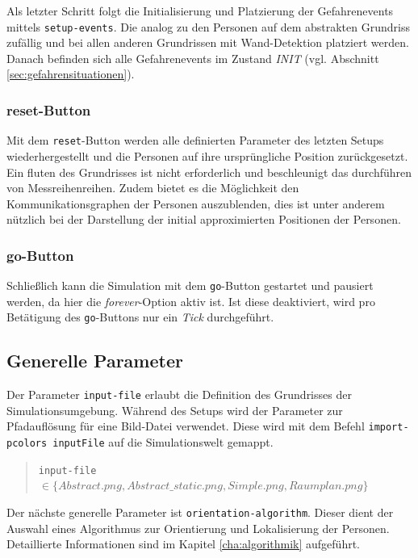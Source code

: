 Als letzter Schritt folgt die Initialisierung und Platzierung der Gefahrenevents  mittels \verb|setup-events|. Die analog zu den Personen auf dem abstrakten Grundriss zufällig und bei allen anderen Grundrissen mit Wand-Detektion platziert werden. Danach befinden sich alle Gefahrenevents im Zustand \emph{INIT} (vgl. Abschnitt \ref{sec:gefahrensituationen}).
 
\subsubsection*{reset-Button}

Mit dem \verb|reset|-Button werden alle definierten Parameter des letzten Setups wiederhergestellt und die Personen auf ihre ursprüngliche Position zurückgesetzt.
Ein fluten des Grundrisses ist nicht erforderlich und beschleunigt das durchführen von Messreihenreihen.
Zudem bietet es die Möglichkeit den Kommunikationsgraphen der Personen auszublenden, dies ist unter anderem nützlich bei der Darstellung der initial approximierten Positionen der Personen.

\subsubsection*{go-Button}

Schließlich kann die Simulation mit dem \verb|go|-Button gestartet und pausiert werden, da hier die \emph{forever}-Option aktiv ist. Ist diese deaktiviert, wird pro Betätigung des \verb|go|-Buttons nur ein \emph{Tick} durchgeführt.

\subsection{Generelle Parameter}
\label{sec:gui_general}

Der Parameter \verb|input-file| erlaubt die Definition des Grundrisses der Simulationsumgebung. Während des Setups wird der Parameter zur Pfadauflösung für eine Bild-Datei verwendet. Diese wird mit dem Befehl \verb|import-pcolors inputFile| auf die Simulationswelt gemappt.

\begin{quote}
\verb|input-file| $\in \{Abstract.png, Abstract\_static.png, Simple.png, Raumplan.png\}$
\end{quote}

Der nächste generelle Parameter ist \verb|orientation-algorithm|. Dieser dient der Auswahl eines Algorithmus zur Orientierung und Lokalisierung der Personen. Detaillierte Informationen sind im Kapitel \ref{cha:algorithmik} aufgeführt.

